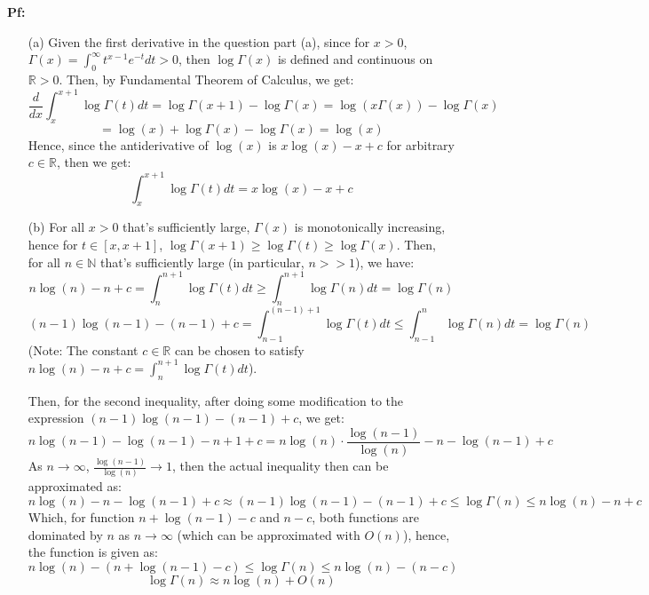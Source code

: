 \documentclass{article}
\begin{document}
\textbf{Pf:}

\begin{itemize}
    \item[(a)] Given the first derivative in the question part (a), since for $x>0$, $\Gamma(x)=\int_{0}^{\infty}t^{x-1}e^{-t}dt>0$, then $\log\Gamma(x)$ is defined and continuous on $\mathbb{R}>0$. Then, by Fundamental Theorem of Calculus, we get:
    $$\frac{d}{dx}\int_{x}^{x+1}\log\Gamma(t)dt = \log\Gamma(x+1)-\log\Gamma(x) = \log(x\Gamma(x))-\log\Gamma(x)$$
    $$= \log(x)+\log\Gamma(x)-\log\Gamma(x)=\log(x)$$
    Hence, since the antiderivative of $\log(x)$ is $x\log(x)-x+c$ for arbitrary $c\in\mathbb{R}$, then we get:
    $$\int_{x}^{x+1}\log\Gamma(t)dt = x\log(x)-x+c$$

    \hfil

    \item[(b)] For all $x>0$ that's sufficiently large, $\Gamma(x)$ is monotonically increasing, hence for $t\in[x,x+1]$, $\log\Gamma(x+1)\geq\log\Gamma(t)\geq \log\Gamma(x)$. Then, for all $n\in\mathbb{N}$ that's sufficiently large (in particular, $n>>1$), we have:
    $$n\log(n)-n+c=\int_{n}^{n+1}\log\Gamma(t)dt\geq \int_{n}^{n+1}\log\Gamma(n)dt = \log\Gamma(n)$$
    $$(n-1)\log(n-1)-(n-1)+c=\int_{n-1}^{(n-1)+1}\log\Gamma(t)dt \leq \int_{n-1}^{n}\log\Gamma(n)dt=\log\Gamma(n)$$
    (Note: The constant $c\in\mathbb{R}$ can be chosen to satisfy $n\log(n)-n+c=\int_{n}^{n+1}\log\Gamma(t)dt$).

    Then, for the second inequality, after doing some modification to the expression $(n-1)\log(n-1)-(n-1)+c$, we get:
    $$n\log(n-1)-\log(n-1)-n+1+c = n\log(n)\cdot\frac{\log(n-1)}{\log(n)}-n-\log(n-1)+c$$
    As $n\rightarrow\infty$, $\frac{\log(n-1)}{\log(n)}\rightarrow 1$, then the actual inequality then can be approximated as:
    $$n\log(n)-n-\log(n-1)+c\approx (n-1)\log(n-1)-(n-1)+c\leq \log\Gamma(n)\leq n\log(n)-n+c$$
    Which, for function $n+\log(n-1)-c$ and $n-c$, both functions are dominated by $n$ as $n\rightarrow \infty$ (which can be approximated with $O(n)$), hence, the function is given as:
    $$n\log(n)-(n+\log(n-1)-c)\leq \log\Gamma(n)\leq n\log(n)-(n-c)$$
    $$\log\Gamma(n)\approx n\log(n)+O(n)$$
\end{itemize}

\hfil

\hfil
\end{document}
